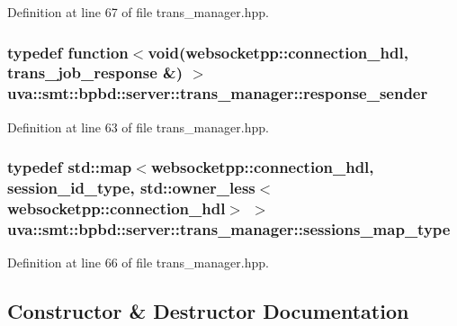 Definition at line 67 of file trans\+\_\+manager.\+hpp.

\hypertarget{classuva_1_1smt_1_1bpbd_1_1server_1_1trans__manager_ac7a3a0d2d4e7d21b2ce55161bf84f53e}{}
\subsubsection[{response\+\_\+sender}]{\setlength{\rightskip}{0pt plus 5cm}typedef function$<$void({\bf websocketpp\+::connection\+\_\+hdl}, {\bf trans\+\_\+job\+\_\+response} \&) $>$ {\bf uva\+::smt\+::bpbd\+::server\+::trans\+\_\+manager\+::response\+\_\+sender}}\label{classuva_1_1smt_1_1bpbd_1_1server_1_1trans__manager_ac7a3a0d2d4e7d21b2ce55161bf84f53e}


Definition at line 63 of file trans\+\_\+manager.\+hpp.

\hypertarget{classuva_1_1smt_1_1bpbd_1_1server_1_1trans__manager_aea69500c7a8a6bcb5b2035a684537bcb}{}
\subsubsection[{sessions\+\_\+map\+\_\+type}]{\setlength{\rightskip}{0pt plus 5cm}typedef std\+::map$<${\bf websocketpp\+::connection\+\_\+hdl}, {\bf session\+\_\+id\+\_\+type}, std\+::owner\+\_\+less$<${\bf websocketpp\+::connection\+\_\+hdl}$>$ $>$ {\bf uva\+::smt\+::bpbd\+::server\+::trans\+\_\+manager\+::sessions\+\_\+map\+\_\+type}}\label{classuva_1_1smt_1_1bpbd_1_1server_1_1trans__manager_aea69500c7a8a6bcb5b2035a684537bcb}


Definition at line 66 of file trans\+\_\+manager.\+hpp.



\subsection{Constructor \& Destructor Documentation}
\hypertarget{classuva_1_1smt_1_1bpbd_1_1server_1_1trans__manager_a053a8f5be8b004358e5e20b3a1810efb}{}
